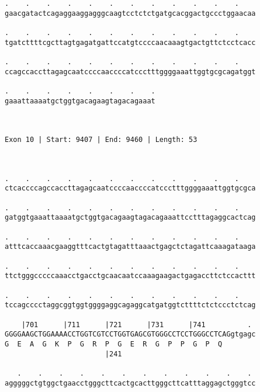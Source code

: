 \documentclass{article}
\begin{document}
\begin{Verbatim}
.    .    .    .    .    .    .    .    .    .    .    .    
gaacgatactcagaggaaggagggcaagtcctctctgatgcacggactgccctggaacaa
                                                            
.    .    .    .    .    .    .    .    .    .    .    .    
tgatcttttcgcttagtgagatgattccatgtccccaacaaagtgactgttctcctcacc
                                                            
.    .    .    .    .    .    .    .    .    .    .    .    
ccagccaccttagagcaatccccaaccccatccctttggggaaattggtgcgcagatggt
                                                            
.    .    .    .    .    .    .    .
gaaattaaaatgctggtgacagaagtagacagaaat
                                    
                                    
 
Exon 10 | Start: 9407 | End: 9460 | Length: 53



.    .    .    .    .    .    .    .    .    .    .    .    
ctcaccccagccaccttagagcaatccccaaccccatccctttggggaaattggtgcgca
                                                            
.    .    .    .    .    .    .    .    .    .    .    .    
gatggtgaaattaaaatgctggtgacagaagtagacagaaattcctttagaggcactcag
                                                            
.    .    .    .    .    .    .    .    .    .    .    .    
atttcaccaaacgaaggtttcactgtagatttaaactgagctctagattcaaagataaga
                                                            
.    .    .    .    .    .    .    .    .    .    .    .    
ttctgggcccccaaacctgacctgcaacaatccaaagaagactgagaccttctccacttt
                                                            
.    .    .    .    .    .    .    .    .    .    .    .    
tccagcccctaggcggtggtggggaggcagaggcatgatggtcttttctctccctctcag
                                                            
    |701      |711      |721      |731      |741          . 
GGGGAAGCTGGAAAACCTGGTCGTCCTGGTGAGCGTGGGCCTCCTGGGCCTCAGgtgagc
G  E  A  G  K  P  G  R  P  G  E  R  G  P  P  G  P  Q        
                        |241                                
  
   .    .    .    .    .    .    .    .    .    .    .    . 
agggggctgtggctgaacctgggcttcactgcacttgggcttcatttaggagctgggtcc
                                                            

\end{Verbatim}
\end{document}
